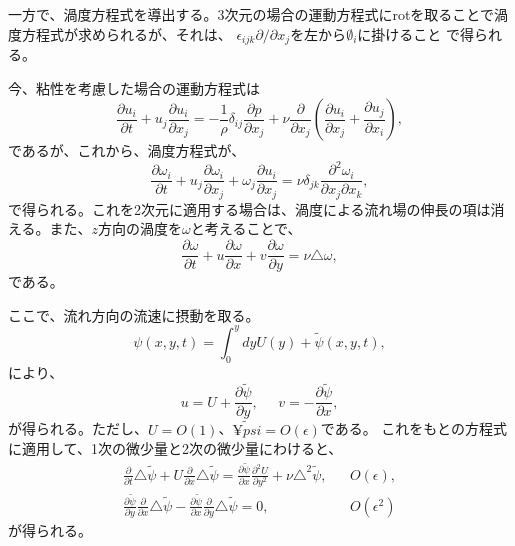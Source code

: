 一方で、渦度方程式を導出する。3次元の場合の運動方程式にrotを取ることで渦
度方程式が求められるが、それは、
$\epsilon_{ijk}\partial / \partial x_j$を左から$\emptyset_i$に掛けること
で得られる。

今、粘性を考慮した場合の運動方程式は
\begin{equation}
 \frac{\partial u_i}{\partial t}
  + u_j\frac{\partial u_i}{\partial x_j}
  = -\frac{1}{\rho}\delta_{ij}\frac{\partial p}{\partial x_j}
  + \nu\frac{\partial}{\partial x_j}
  \left(\frac{\partial u_i}{\partial x_j} + \frac{\partial u_j}{\partial x_i}\right),
\end{equation}
であるが、これから、渦度方程式が、
\begin{equation}
 \frac{\partial\omega_i}{\partial t}
  + u_j\frac{\partial \omega_i}{\partial x_j}
  + \omega_j\frac{\partial u_i}{\partial x_j}
  = \nu\delta_{jk}\frac{\partial^2\omega_i}{\partial x_j\partial x_k},
\end{equation}
で得られる。これを2次元に適用する場合は、渦度による流れ場の伸長の項は消
える。また、$z$方向の渦度を$\omega$と考えることで、
\begin{equation}
 \frac{\partial\omega}{\partial t}
  + u\frac{\partial\omega}{\partial x}
  + v\frac{\partial\omega}{\partial y}
  = \nu\triangle\omega,
\end{equation}
である。

ここで、流れ方向の流速に摂動を取る。
\begin{equation}
 \psi(x,y,t) = \int_{0}^{y}dy U(y) + \tilde{\psi}(x,y,t),
\end{equation}
により、
\begin{equation}
 u = U + \frac{\partial\tilde{\psi}}{\partial y}, \mspace{25mu}
  v = -\frac{\partial\tilde{\psi}}{\partial x},
\end{equation}
が得られる。ただし、$U=O(1)$、$\tilde{¥psi}=O(\epsilon)$である。
これをもとの方程式に適用して、1次の微少量と2次の微少量にわけると、
\begin{align}
 \frac{\partial}{\partial t}\triangle\tilde{\psi}
  + U\frac{\partial}{\partial x}\triangle\tilde{\psi}
  = \frac{\partial\tilde{\psi}}{\partial x}\frac{\partial^2U}{\partial
  y^2} 
  + \nu\triangle^2\tilde{\psi}, & & O(\epsilon),  \label{proto_orr-sommerfeld}\\
  \frac{\partial\tilde{\psi}}{\partial y}
  \frac{\partial}{\partial x}\triangle\tilde{\psi}
  -  \frac{\partial\tilde{\psi}}{\partial x}
  \frac{\partial}{\partial y}\triangle\tilde{\psi} = 0, & & O(\epsilon^2) 
\end{align}
が得られる。

